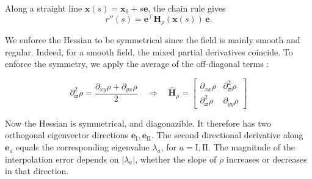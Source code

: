\documentclass[11pt,a4paper]{article}
\newcommand{\dpartial}[1]{\partial_{\boxslash}^{2}#1}
\begin{document}
\noindent
Along a straight line \(\mathbf x(s)=\mathbf x_0+s\mathbf e\), the chain rule gives
\begin{equation}
  r''(s)=\mathbf e^\top \mathbf{H}_\rho(\mathbf x(s))\,\mathbf e .
\end{equation}

\noindent
We enforce the Hessian to be symmetrical since the field is mainly smooth and regular. Indeed, for a smooth field, the mixed partial derivatives coincide. To enforce the symmetry, we apply the average of the off-diagonal terms : 

\begin{equation}
    \dpartial{\rho} = \frac{\partial_{xy}\rho + \partial_{yx}\rho}{2} \quad \Rightarrow \quad \widehat{\mathbf{H}}_{\rho} =\begin{bmatrix}
\partial_{xx}\rho & \dpartial{\rho} \\
 \dpartial{\rho} & \partial_{yy}\rho 
\end{bmatrix}
\end{equation}

\noindent
Now the Hessian is symmetrical, and diagonazible. It therefore has two orthogonal eigenvector directions \(\mathbf e_\mathrm{I},\mathbf e_\mathrm{II}\). The second directional derivative
along \(\mathbf e_a\) equals the corresponding eigenvalue \(\lambda_a\),
for \(a=\mathrm{I},\mathrm{II}\). The magnitude of the interpolation error depends on
\(\lvert\lambda_a\rvert\), whether the slope of \(\rho\) increases or
decreases in that direction.\\
\end{document}
